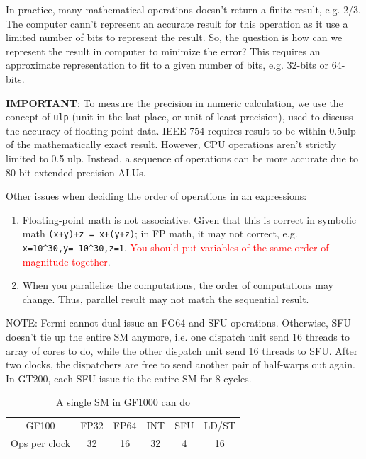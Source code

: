 \begin{framed}
In practice, many mathematical operations doesn't return a finite result, e.g.
2/3. The computer cann't represent an accurate result for this operation as
it use a limited number of bits to represent the result. So, the question is how
can we represent the result in computer to minimize the error? This requires an
approximate representation to fit to a given number of bits, e.g. 32-bits or
64-bits. 
  
  {\bf IMPORTANT}: To measure the precision in numeric calculation, we use
  the concept of \verb!ulp! (unit in the last place, or unit of least
  precision), used to discuss the accuracy of floating-point data. IEEE 754 requires result to be within 0.5ulp of the mathematically exact result. However, CPU
  operations aren't strictly limited to 0.5 ulp. Instead, a sequence
  of operations can be more accurate due to 80-bit extended precision
  ALUs. 
\end{framed}

Other issues when deciding the order of operations in an expressions: 
\begin{enumerate}
\item Floating-point math is not associative. Given that this is
  correct in symbolic math \verb!(x+y)+z = x+(y+z)!; in FP math, it
  may not correct,
  e.g. \verb!x=10^30,y=-10^30,z=1!. \textcolor{red}{You should put
    variables of the same order of magnitude together}. 

\item When you parallelize the computations, the order of computations
  may change. Thus, parallel result may not match the sequential
  result. 
\end{enumerate}

NOTE: Fermi cannot dual issue an FG64 and SFU operations. Otherwise,
SFU doesn't tie up the entire SM anymore, i.e. one dispatch unit send
16 threads to array of cores to do, while the other dispatch unit send
16 threads to SFU. After two clocks, the dispatchers are free to send
another pair of half-warps out again. In GT200, each SFU issue tie the
entire SM for 8 cycles. 

\begin{table}[hbt]
  \begin{center}
    \caption{A single SM in GF1000 can do}
    \begin{tabular}{cccccc} 
      \hline
      GF100 &   FP32&   FP64&   INT&   SFU&   LD/ST \\
      Ops per clock&   32&   16&   32&   4&   16 \\
      \hline\hline
    \end{tabular}
  \end{center}
  \label{tab:gf100_sm_do}
\end{table}

